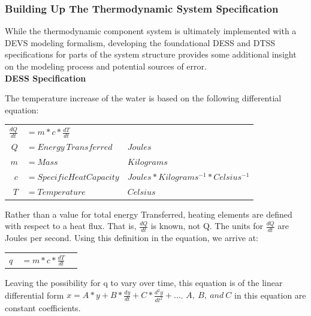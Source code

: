 \documentclass[10pt]{article}
\begin{document}
\subsubsection{Building Up The Thermodynamic System Specification}
\label{sec:buiTheSysSpe}
While the thermodynamic component system is ultimately implemented with a DEVS modeling formalism, developing the foundational DESS and DTSS specifications for parts of the system structure provides some additional insight on the modeling process and potential sources of error.
~\\

\textbf{DESS Specification}

The temperature increase of the water is based on the following differential equation:
\begin{center}
  \begin{tabular}{r l l}
    $\frac{dQ}{dt}$ & $=m*c*\frac{dT}{dt}$ \\
    $Q$ & $=Energy~Transferred$ & $Joules$ \\
    $m$ & $=Mass$ & $Kilograms$ \\
    $c$ & $=Specific Heat Capacity$ & $Joules*Kilograms^{-1}*Celsius^{-1}$ \\
    $T$ & $=Temperature$ & $Celsius$ \\
  \end{tabular}
\end{center}

Rather than a value for total energy Transferred, heating elements are defined with respect to a heat flux.  That is, $\frac{dQ}{dt}$ is known, not Q.  The units for $\frac{dQ}{dt}$ are Joules per second.  Using this definition in the equation, we arrive at:
\begin{center}
  \begin{tabular}{r l l}
    $q$ & $=m*c*\frac{dT}{dt}$
  \end{tabular}
\end{center}
Leaving the possibility for q to vary over time, this equation is of the linear differential form $x = A*y+B*\frac{dy}{dt}+C*\frac{d^2y}{dt^2}+...$.  $A,~B,~and~C$ in this equation are constant coefficients.
\end{document}
